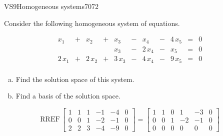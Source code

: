 \begin{exercise}{VS9}{Homogeneous systems}{7072} 
\begin{exerciseStatement} 

Consider the following homogeneous system of equations.

 \[\begin{matrix}
 x_{1} &  +  & x_{2} &  +  & x_{3} &  -  & x_{4} &  -  & 4 \, x_{5} & = & 0 \\
 &  &  &  & x_{3} &  -  & 2 \, x_{4} &  -  & x_{5} & = & 0 \\
 2 \, x_{1} &  +  & 2 \, x_{2} &  +  & 3 \, x_{3} &  -  & 4 \, x_{4} &  -  & 9 \, x_{5} & = & 0 \\
 \end{matrix}\] 

\begin{enumerate}[(a)]
\item  Find the solution space of this system.
\item  Find a basis of the solution space.
\end{enumerate}

     \end{exerciseStatement}
 \begin{exerciseAnswer} 

\[\mathrm{RREF}\,\left[\begin{array}{ccccc|c}
1 & 1 & 1 & -1 & -4 & 0 \\
0 & 0 & 1 & -2 & -1 & 0 \\
2 & 2 & 3 & -4 & -9 & 0
\end{array}\right]=\left[\begin{array}{ccccc|c}
1 & 1 & 0 & 1 & -3 & 0 \\
0 & 0 & 1 & -2 & -1 & 0 \\
0 & 0 & 0 & 0 & 0 & 0
\end{array}\right]\]

 


\end{exerciseAnswer}
\end{exercise}
